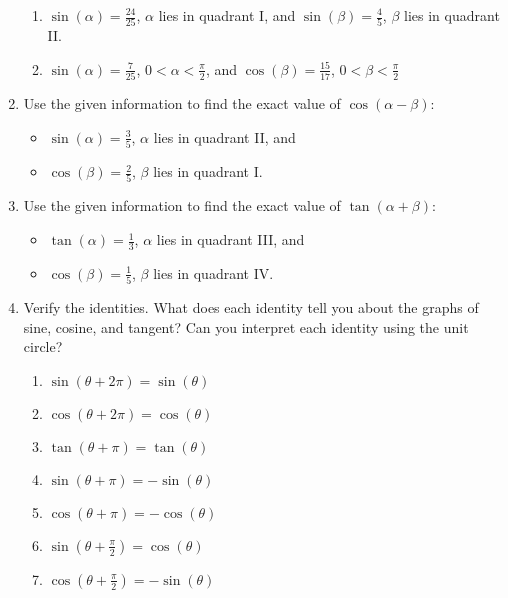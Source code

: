 \begin{enumerate}
\begin{enumerate}
\item $\sin(\alpha)=\frac{24}{25}$, $\alpha$ lies in quadrant I, and $\sin(\beta)=\frac{4}{5}$, $\beta$ lies in quadrant II.
\vfill


\item $\sin(\alpha)=\frac{7}{25}$, $0<\alpha<\frac{\pi}{2}$, and $\cos(\beta)=\frac{15}{17}$, $0<\beta<\frac{\pi}{2}$
\vfill
\end{enumerate}

\newpage

\item Use the given information to find the exact value of $\cos(\alpha-\beta)$:
\begin{itemize}
	\item $\sin(\alpha)=\frac{3}{5}$, $\alpha$ lies in quadrant II, and
	\item  $\cos(\beta)=\frac{2}{5}$, $\beta$ lies in quadrant I.
\end{itemize}
\vfill

\item Use the given information to find the exact value of $\tan(\alpha+\beta)$:
\begin{itemize}
	\item $\tan(\alpha)=\frac{1}{3}$, $\alpha$ lies in quadrant III, and
	\item $\cos(\beta)=\frac{1}{5}$, $\beta$ lies in quadrant IV.

\end{itemize}

\vfill
\newpage

\item Verify the identities.  What does each identity tell you about the graphs of sine, cosine, and tangent?  Can you interpret each identity using the unit circle?

\begin{enumerate}
\item $\displaystyle\sin\left(\theta+2\pi\right)=\sin(\theta)$
\vfill
\item $\displaystyle\cos\left(\theta+2\pi\right)=\cos(\theta)$
\vfill
\item $\displaystyle\tan\left(\theta+\pi\right)=\tan(\theta)$
\vfill
\item $\displaystyle\sin\left(\theta+\pi\right)=-\sin(\theta)$
\vfill
\item $\displaystyle\cos\left(\theta+\pi\right)=-\cos(\theta)$
\vfill
\item $\displaystyle\sin\left(\theta+\frac{\pi}{2}\right)=\cos(\theta)$
\vfill
\item $\displaystyle\cos\left(\theta+\frac{\pi}{2}\right)=-\sin(\theta)$
\vfill

\end{enumerate}


\end{enumerate}


